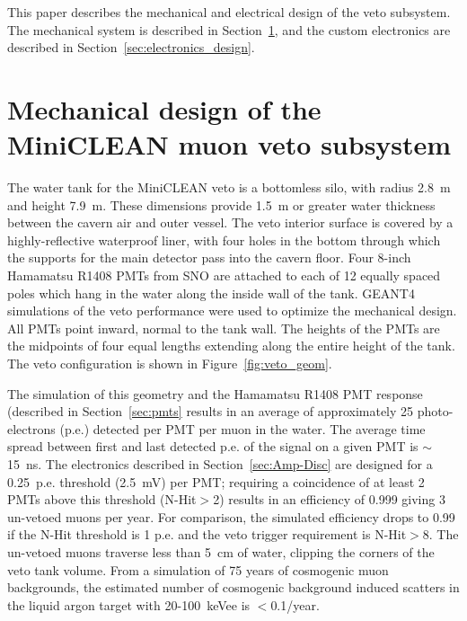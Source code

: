 \documentclass{JINST}
\begin{document}
This paper describes the mechanical and electrical design of the veto
subsystem.  The mechanical system is described in
Section~\ref{sec:subsystem_design}, and the custom electronics are
described in Section~\ref{sec:electronics_design}.


\section{Mechanical design of the MiniCLEAN muon veto subsystem}
\label{sec:subsystem_design}
%
The water tank for the MiniCLEAN veto is a bottomless silo, with
radius 2.8~m and height 7.9~m. These dimensions provide 1.5~m or
greater water thickness between the cavern air and outer vessel. The
veto interior surface is covered by a highly-reflective waterproof liner, with four
holes in the bottom through which the supports for the main detector
pass into the cavern floor. Four 8-inch Hamamatsu R1408 PMTs from SNO are
attached to each of 12 equally spaced poles which hang in the water
along the inside wall of the tank. GEANT4~\cite{ref:geant4} simulations
of the veto performance were used to optimize the mechanical
design. All PMTs point inward, normal to the tank wall. The heights
of the PMTs are the midpoints of four equal lengths extending along
the entire height of the tank. The veto configuration is shown in
Figure~\ref{fig:veto_geom}.  

The simulation of this geometry and the Hamamatsu R1408 PMT response (described
in Section~\ref{sec:pmts} results in an average of approximately 25
photo-electrons (p.e.) detected per PMT per muon in the water.  The
average time spread between first and last detected p.e. of the signal
on a given PMT is $\sim$15~ns.  The electronics described in
Section~\ref{sec:Amp-Disc} are designed for a 0.25~p.e. threshold (2.5~mV)
per PMT; requiring a coincidence of at least 2 PMTs above this
threshold (N-Hit$>$2) results in an efficiency of 0.999 giving 3
un-vetoed muons per year.  For comparison, the simulated efficiency
drops to 0.99 if the N-Hit threshold is 1 p.e. and the veto trigger
requirement is N-Hit$>$8.  The un-vetoed muons traverse less than 5~cm
of water, clipping the corners of the veto tank volume.  From a
simulation of 75 years of cosmogenic muon backgrounds, the estimated
number of cosmogenic background induced scatters in the liquid argon
target with 20-100~keVee is $<$0.1/year.
\end{document}
